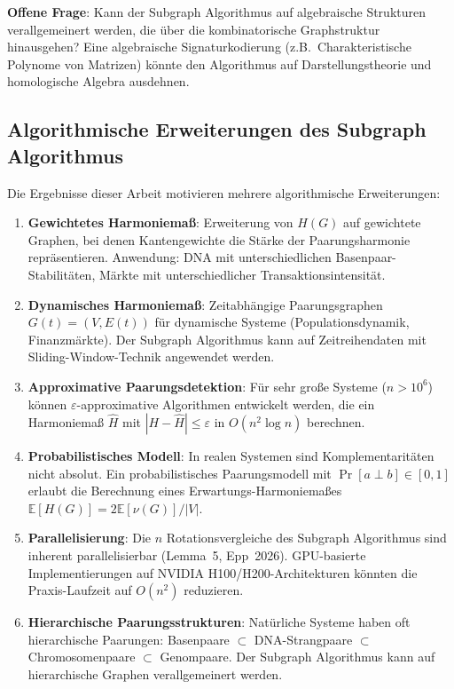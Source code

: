 ﻿\documentclass[a4paper,12pt]{article}
\theoremstyle{definition}
\begin{document}
\textbf{Offene Frage}: Kann der Subgraph Algorithmus auf algebraische Strukturen
verallgemeinert werden, die über die kombinatorische Graphstruktur hinausgehen?
Eine algebraische Signaturkodierung (z.B.\ Charakteristische Polynome von Matrizen)
könnte den Algorithmus auf Darstellungstheorie und homologische Algebra ausdehnen.

\subsection{Algorithmische Erweiterungen des Subgraph Algorithmus}

Die Ergebnisse dieser Arbeit motivieren mehrere algorithmische Erweiterungen:

\begin{enumerate}
	\item \textbf{Gewichtetes Harmoniemaß}: Erweiterung von $H(G)$ auf gewichtete
	Graphen, bei denen Kantengewichte die Stärke der Paarungsharmonie repräsentieren.
	Anwendung: DNA mit unterschiedlichen Basenpaar-Stabilitäten, Märkte mit
	unterschiedlicher Transaktionsintensität.
	
	\item \textbf{Dynamisches Harmoniemaß}: Zeitabhängige Paarungsgraphen
	$G(t) = (V, E(t))$ für dynamische Systeme (Populationsdynamik, Finanzmärkte).
	Der Subgraph Algorithmus kann auf Zeitreihendaten mit Sliding-Window-Technik
	angewendet werden.
	
	\item \textbf{Approximative Paarungsdetektion}: Für sehr große Systeme
	($n > 10^6$) können $\varepsilon$-approximative Algorithmen entwickelt werden,
	die ein Harmoniemaß $\hat{H}$ mit $|H - \hat{H}| \leq \varepsilon$ in
	$O(n^2 \log n)$ berechnen.
	
	\item \textbf{Probabilistisches Modell}: In realen Systemen sind Komplementaritäten
	nicht absolut. Ein probabilistisches Paarungsmodell mit $\Pr[a \perp b] \in [0,1]$
	erlaubt die Berechnung eines Erwartungs-Harmoniemaßes
	$\mathbb{E}[H(G)] = 2\mathbb{E}[\nu(G)]/|V|$.
	
	\item \textbf{Parallelisierung}: Die $n$ Rotationsvergleiche des Subgraph Algorithmus
	sind inherent parallelisierbar (Lemma~5, Epp~2026). GPU-basierte Implementierungen
	auf NVIDIA H100/H200-Architekturen könnten die Praxis-Laufzeit auf $O(n^2)$
	reduzieren.
	
	\item \textbf{Hierarchische Paarungsstrukturen}: Natürliche Systeme haben oft
	hierarchische Paarungen: Basenpaare $\subset$ DNA-Strangpaare $\subset$
	Chromosomenpaare $\subset$ Genompaare. Der Subgraph Algorithmus kann auf
	hierarchische Graphen verallgemeinert werden.
\end{enumerate}
\end{document}

